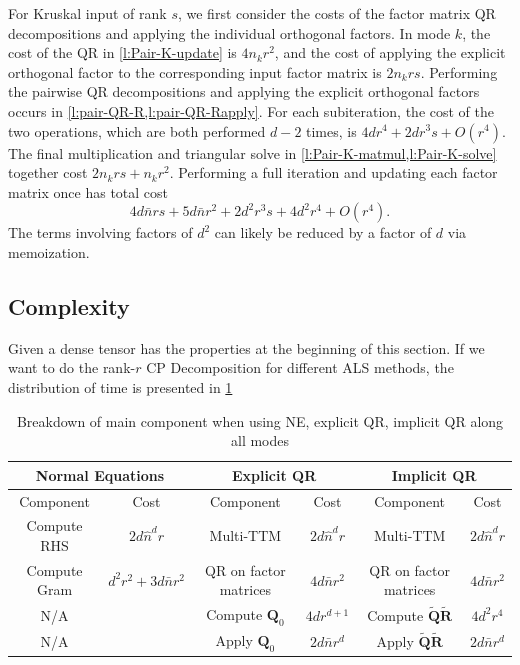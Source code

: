 \documentclass{article}
\newcommand{\mat}[1]{\mathbf{#1}}
\begin{document}
For Kruskal input of rank $s$, we first consider the costs of the factor matrix QR decompositions and applying the individual orthogonal factors.
In mode $k$, the cost of the QR in \cref{l:Pair-K-update} is $4n_kr^2$, and the cost of applying the explicit orthogonal factor to the corresponding input factor matrix is $2n_krs$.
Performing the pairwise QR decompositions and applying the explicit orthogonal factors occurs in \cref{l:pair-QR-R,l:pair-QR-Rapply}.
For each subiteration, the cost of the two operations, which are both performed $d-2$ times, is $4dr^4+2dr^3s+O(r^4)$.
The final multiplication and triangular solve in \cref{l:Pair-K-matmul,l:Pair-K-solve} together cost $2n_krs+n_kr^2$.
Performing a full iteration and updating each factor matrix once has total cost
$$ 4d\bar{n}rs + 5d\bar{n}r^2 + 2d^2r^3s + 4d^2r^4 + O(r^4). $$
The terms involving factors of $d^2$ can likely be reduced by a factor of $d$ via memoization.

\subsection{Complexity}
Given a dense tensor has the properties at the beginning of this section. 
If we want to do the rank-$r$ CP Decomposition for different ALS methods, the distribution of time is presented in \cref{tab:dense_its_part}


\begin{table}[!ht] 
  \centering
  \begin{tabular}{|c|c|c|c|c|c|}
    \hline
    \multicolumn{2}{|c|}{\textbf{Normal Equations}} & \multicolumn{2}{|c|}{\textbf{Explicit QR}} & \multicolumn{2}{|c|}{\textbf{Implicit QR}} \\
    \hline
    Component & Cost & Component & Cost & Component & Cost \\
    \hline
    Compute RHS &$2d \hat{n}^d r$ &Multi-TTM &$2d\hat n^d r$  & Multi-TTM &$2d\hat n^d r$  \\
    Compute Gram & $d^2r^2 + 3d \bar{n} r^2$&QR on factor matrices & $4d \bar n r^2$ & QR on factor matrices & $4d \bar n r^2$\\
    N/A& &Compute $\mat{Q}_0$ & $4dr^{d+1}$& Compute $\tilde{\mat{Q}}\tilde{\mat{R}}$& $4d^2r^4$\\
    N/A & &Apply $\mat{Q}_0$& $2d\bar n r^d$& Apply $\tilde{\mat{Q}}\tilde{\mat{R}}$& $2d\bar n r^d$\\
    \hline
  \end{tabular}
  \caption{Breakdown of main component when using NE, explicit QR, implicit QR along all modes}
  \label{tab:dense_its_part}
\end{table}
\end{document}
